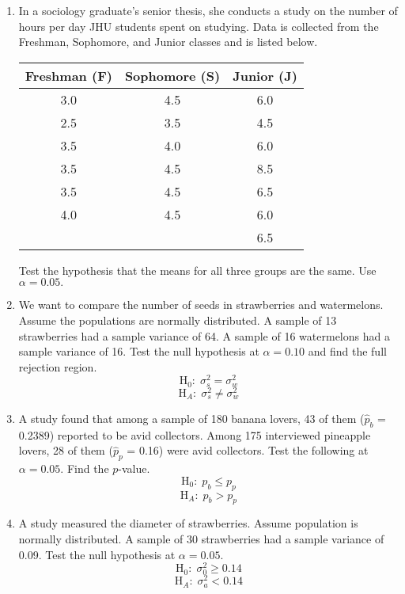 \begin{enumerate}[Q 1.]
\item  In a sociology graduate's senior thesis, she conducts a study on the number of hours per day JHU students spent on studying. Data is collected from the Freshman, Sophomore, and Junior classes and is listed below.\\

\begin{center}
\begin{tabular}{|c|c|c|}
\hline 
Freshman (F)& Sophomore (S)& Junior (J)\\
\hline
3.0 & 4.5 & 6.0\\
2.5 & 3.5 & 4.5 \\
3.5 & 4.0 & 6.0 \\
3.5 & 4.5 & 8.5 \\
3.5 & 4.5 & 6.5 \\
4.0 & 4.5 & 6.0 \\
& &         6.5 \\           
\hline \end{tabular}
\end{center}
Test the hypothesis that the means for all three groups are the same. Use $\alpha=0.05.$

\vspace{35mm} 
\item We want to compare the number of seeds in strawberries and watermelons. Assume the populations are normally distributed. A sample of 13 strawberries had a sample variance of 64. A sample of 16 watermelons had a sample variance of 16. Test the null hypothesis at $\alpha = 0.10$ and find the full rejection region. 
$$\text{H}_0: \; \sigma_s^2=\sigma_w^2$$
$$\text{H}_A: \; \sigma_s^2 \neq \sigma_w^2$$

\vspace{35mm}
\item A study found that among a sample of 180 banana lovers, 43 of them ($\hat{p}_b$ =  0.2389) reported to be avid collectors. Among 175 interviewed pineapple lovers, 28 of them ($\hat{p}_p$ =  0.16) were avid collectors. Test the following at $\alpha = 0.05$. Find the $p$-value.
$$\text{H}_0: \; p_b \leq p_p$$
$$\text{H}_A: \; p_b > p_p$$
	
\vspace{35mm}
\item A study measured the diameter of strawberries. Assume population is normally distributed. A sample of 30 strawberries had a sample variance of 0.09. Test the null hypothesis at $\alpha = 0.05$. 
$$\text{H}_0: \; \sigma_0^2 \geq 0.14$$
$$\text{H}_A: \; \sigma_a^2 < 0.14$$


\end{enumerate}
